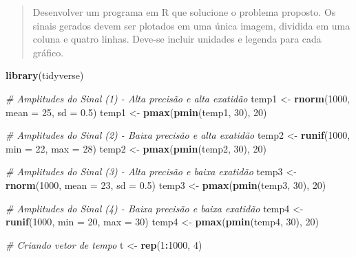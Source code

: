 \documentclass[
]{article}
\newenvironment{Shaded}{\begin{snugshade}}{\end{snugshade}}
\newcommand{\AttributeTok}[1]{\textcolor[rgb]{0.13,0.29,0.53}{#1}}
\newcommand{\CommentTok}[1]{\textcolor[rgb]{0.56,0.35,0.01}{\textit{#1}}}
\newcommand{\DecValTok}[1]{\textcolor[rgb]{0.00,0.00,0.81}{#1}}
\newcommand{\FloatTok}[1]{\textcolor[rgb]{0.00,0.00,0.81}{#1}}
\newcommand{\FunctionTok}[1]{\textcolor[rgb]{0.13,0.29,0.53}{\textbf{#1}}}
\newcommand{\NormalTok}[1]{#1}
\newcommand{\OtherTok}[1]{\textcolor[rgb]{0.56,0.35,0.01}{#1}}
\newcommand{\SpecialCharTok}[1]{\textcolor[rgb]{0.81,0.36,0.00}{\textbf{#1}}}
\begin{document}
\begin{quote}
Desenvolver um programa em R que solucione o problema proposto. Os
sinais gerados devem ser plotados em uma única imagem, dividida em uma
coluna e quatro linhas. Deve-se incluir unidades e legenda para cada
gráfico.
\end{quote}

\begin{Shaded}
\begin{Highlighting}[]
\FunctionTok{library}\NormalTok{(tidyverse)}

\CommentTok{\# Amplitudes do Sinal (1) {-} Alta precisão e alta exatidão}
\NormalTok{temp1 }\OtherTok{\textless{}{-}} \FunctionTok{rnorm}\NormalTok{(}\DecValTok{1000}\NormalTok{, }\AttributeTok{mean =} \DecValTok{25}\NormalTok{, }\AttributeTok{sd =} \FloatTok{0.5}\NormalTok{)}
\NormalTok{temp1 }\OtherTok{\textless{}{-}} \FunctionTok{pmax}\NormalTok{(}\FunctionTok{pmin}\NormalTok{(temp1, }\DecValTok{30}\NormalTok{), }\DecValTok{20}\NormalTok{)}

\CommentTok{\# Amplitudes do Sinal (2) {-} Baixa precisão e alta exatidão}
\NormalTok{temp2 }\OtherTok{\textless{}{-}} \FunctionTok{runif}\NormalTok{(}\DecValTok{1000}\NormalTok{, }\AttributeTok{min =} \DecValTok{22}\NormalTok{, }\AttributeTok{max =} \DecValTok{28}\NormalTok{)}
\NormalTok{temp2 }\OtherTok{\textless{}{-}} \FunctionTok{pmax}\NormalTok{(}\FunctionTok{pmin}\NormalTok{(temp2, }\DecValTok{30}\NormalTok{), }\DecValTok{20}\NormalTok{)}

\CommentTok{\# Amplitudes do Sinal (3) {-} Alta precisão e baixa exatidão}
\NormalTok{temp3 }\OtherTok{\textless{}{-}} \FunctionTok{rnorm}\NormalTok{(}\DecValTok{1000}\NormalTok{, }\AttributeTok{mean =} \DecValTok{23}\NormalTok{, }\AttributeTok{sd =} \FloatTok{0.5}\NormalTok{)}
\NormalTok{temp3 }\OtherTok{\textless{}{-}} \FunctionTok{pmax}\NormalTok{(}\FunctionTok{pmin}\NormalTok{(temp3, }\DecValTok{30}\NormalTok{), }\DecValTok{20}\NormalTok{)}

\CommentTok{\# Amplitudes do Sinal (4) {-} Baixa precisão e baixa exatidão}
\NormalTok{temp4 }\OtherTok{\textless{}{-}} \FunctionTok{runif}\NormalTok{(}\DecValTok{1000}\NormalTok{, }\AttributeTok{min =} \DecValTok{20}\NormalTok{, }\AttributeTok{max =} \DecValTok{30}\NormalTok{)}
\NormalTok{temp4 }\OtherTok{\textless{}{-}} \FunctionTok{pmax}\NormalTok{(}\FunctionTok{pmin}\NormalTok{(temp4, }\DecValTok{30}\NormalTok{), }\DecValTok{20}\NormalTok{)}

\CommentTok{\# Criando vetor de tempo}
\NormalTok{t }\OtherTok{\textless{}{-}} \FunctionTok{rep}\NormalTok{(}\DecValTok{1}\SpecialCharTok{:}\DecValTok{1000}\NormalTok{, }\DecValTok{4}\NormalTok{)}


\end{Highlighting}
\end{Shaded}
\end{document}
